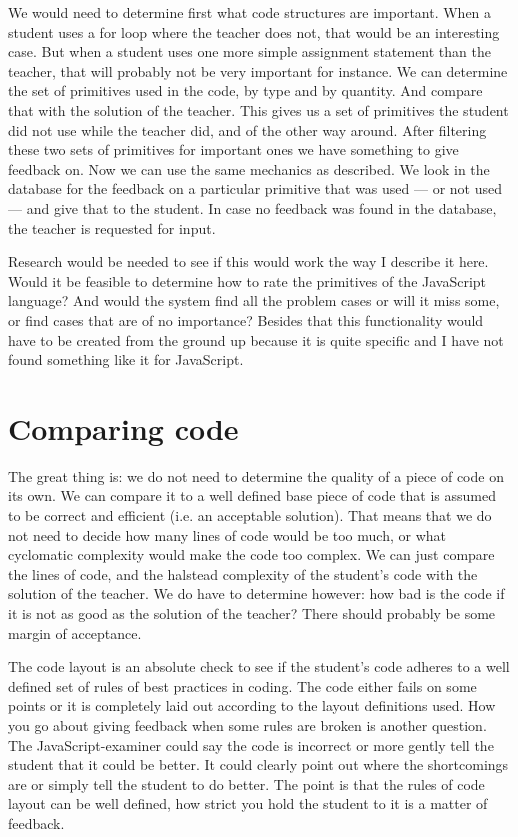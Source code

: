 \documentclass{article}
\begin{document}
We would need to determine first what code structures are important. When a
student uses a for loop where the teacher does not, that would be an
interesting case. But when a student uses one more simple assignment statement
than the teacher, that will probably not be very important for instance. We can
determine the set of primitives used in the code, by type and by quantity. And
compare that with the solution of the teacher. This gives us a set of
primitives the student did not use while the teacher did, and of the other way
around. After filtering these two sets of primitives for important ones we have
something to give feedback on. Now we can use the same mechanics as
\citet{watson2011learning} described. We look in the database for the feedback
on a particular primitive that was used --- or not used --- and give that to
the student. In case no feedback was found in the database, the teacher is
requested for input.

Research would be needed to see if this would work the way I describe it
here. Would it be feasible to determine how to rate the primitives of the
JavaScript language? And would the system find all the problem cases or will it
miss some, or find cases that are of no importance? Besides that this functionality would have to be created from the ground up because it is quite specific and I have not found something like it for JavaScript.

\section{Comparing code}

The great thing is: we do not need to determine the quality of a piece of code
on its own. We can compare it to a well defined base piece of code that is
assumed to be correct and efficient (i.e. an acceptable solution). That means
that we do not need to decide how many lines of code would be too much, or what
cyclomatic complexity would make the code too complex. We can just compare the
lines of code, and the halstead complexity of the student's code with the
solution of the teacher. We do have to determine however: how bad is the code
if it is not as good as the solution of the teacher? There should probably be
some margin of acceptance.

The code layout is an absolute check to see if the student's code adheres to a
well defined set of rules of best practices in coding. The code either fails on
some points or it is completely laid out according to the layout definitions
used. How you go about giving feedback when some rules are broken is another
question. The JavaScript-examiner could say the code is incorrect or more
gently tell the student that it could be better. It could clearly point out
where the shortcomings are or simply tell the student to do better. The point
is that the rules of code layout can be well defined, how strict you hold the
student to it is a matter of feedback.
\end{document}
